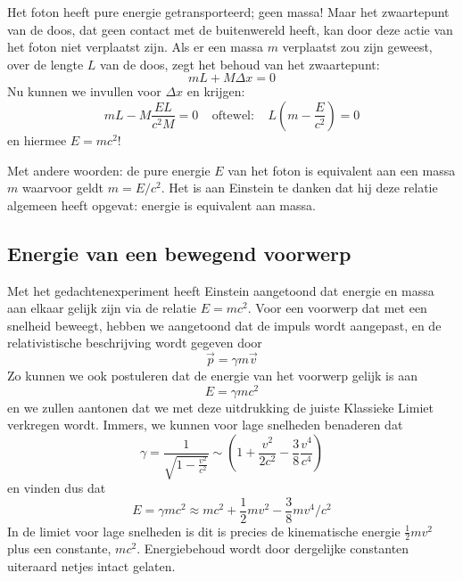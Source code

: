 Het foton heeft pure energie getransporteerd; geen massa! Maar het
zwaartepunt van de doos, dat geen contact met de buitenwereld heeft, kan door deze
actie van het foton niet verplaatst zijn. Als er een massa $m$ verplaatst zou zijn geweest, 
over de lengte $L$ van de doos, zegt het behoud van het zwaartepunt:
\[
mL + M\Delta x = 0
\]
Nu kunnen we invullen voor $\Delta x$ en krijgen:
\[
 mL - M\frac{EL}{c^2M} = 0\;\;\;\; \mbox{oftewel:} \;\;\;\; L\left(m-\frac{E}{c^2}\right) = 0
\]
en hiermee $E=mc^2$!

Met andere woorden: de pure energie $E$ van het foton is equivalent aan een massa $m$ waarvoor geldt
$m=E/c^2$. Het is aan Einstein te danken dat hij deze relatie algemeen heeft opgevat: energie is 
equivalent aan massa.

\subsection{Energie van een bewegend voorwerp}
Met het gedachtenexperiment heeft Einstein aangetoond dat energie en
massa aan elkaar gelijk zijn via de relatie $E=mc^2$. Voor een
voorwerp dat met een snelheid beweegt, hebben we aangetoond dat de
impuls wordt aangepast, en de relativistische beschrijving wordt
gegeven door
\begin{equation}\label{e:impulsmov}
\vec{p} = \gamma m \vec{v}
\end{equation} 
Zo kunnen we ook postuleren dat de energie van het voorwerp gelijk is aan
\begin{equation}\label{e:energymov}
E = \gamma m c^2
\end{equation}
en we zullen aantonen dat we met deze uitdrukking de juiste Klassieke Limiet verkregen wordt. 
Immers, we kunnen voor lage snelheden benaderen dat
\[
\gamma  = \frac{1}{\sqrt{1-\frac{v^2}{c^2}}} \sim \left( 1 + \frac{v^2}{2c^2} - 
\frac{3}{8}\frac{v^4}{c^4}\right)  
\]
en vinden dus dat
\[
E = \gamma m c^2 \approx mc^2 + \frac{1}{2} m v^2 - \frac{3}{8} m v^4 / c^2
\]
In de limiet voor lage snelheden is dit is precies de kinematische energie $\frac{1}{2}mv^2$ 
plus een constante, $mc^2$. Energiebehoud wordt door dergelijke 
constanten uiteraard netjes intact gelaten.

